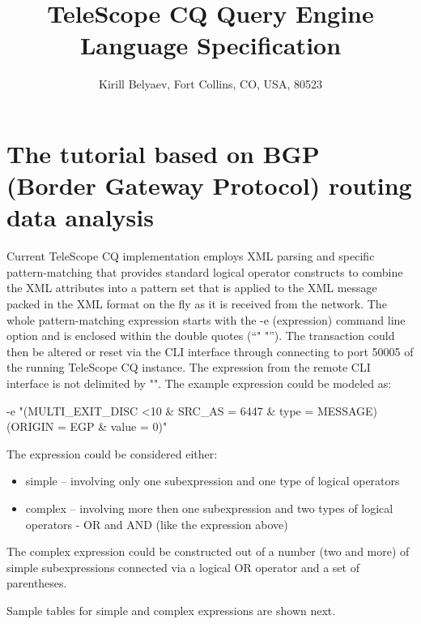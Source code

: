 \documentclass[11pt]{article} %
\title{TeleScope CQ Query Engine Language Specification}
\author{Kirill Belyaev, Fort Collins, CO, USA, 80523}
\begin{document}
\maketitle

\section{The tutorial based on BGP (Border Gateway Protocol) routing data analysis}

	Current TeleScope CQ implementation employs XML parsing and specific pattern-matching that provides standard logical operator constructs to combine the XML attributes into a pattern set that is applied to the XML message packed in the XML format on the fly as it is received from the network. The whole pattern-matching expression starts with the -e (expression) command line option and is enclosed within the double quotes  (“" "”). The transaction could then be altered or reset via the CLI interface through connecting to port 50005 of the running TeleScope CQ instance. The expression from the remote CLI interface is not delimited by "".  The example expression could be modeled as:

 -e "(MULTI\_EXIT\_DISC \textless 10 \& SRC\_AS = 6447 \& type = MESSAGE) \textbar \space (ORIGIN = EGP \& value = 0)"

The expression could be considered either:
\begin{itemize}
\item{simple -- involving only one subexpression and one type of logical operators}
\item{complex -- involving more then one subexpression and two types of logical operators - OR and AND  (like the expression above)}
\end{itemize}

The complex expression could be constructed out of a number (two and more) of simple subexpressions connected via a logical \textbar \space OR operator and a set of parentheses. 

Sample tables for simple and complex expressions are shown next.
\end{document}
